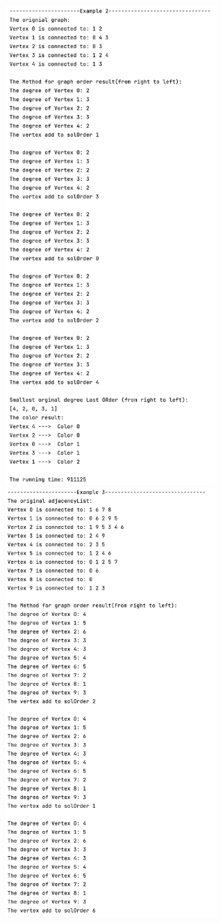 \documentclass{article}
\begin{document}
\begin{enumerate}
\begin{center}
        \includegraphics[width=0.6\textwidth]{p19.png}
        \includegraphics[width=0.6\textwidth]{p20.png}

\end{center}
\end{enumerate}
\end{document}
